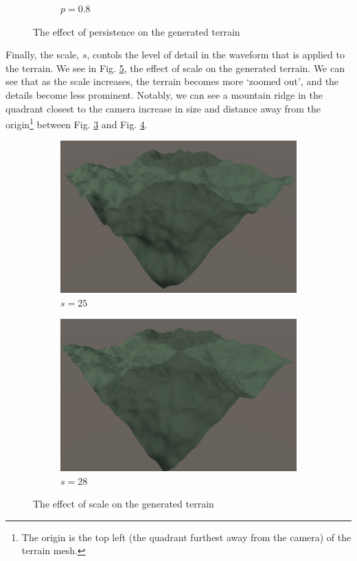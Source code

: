\documentclass{article}
\begin{document}
\begin{figure}[H]
\begin{subfigure}{0.3\textwidth}
        \caption{$p=0.8$}
        \label{fig:persistence0.8}
    \end{subfigure}
    \caption{The effect of persistence on the generated terrain}
    \label{fig:persistence}
\end{figure}

Finally, the scale, $s$, contols the level of detail in the waveform that is applied to the terrain. We see in Fig. \ref{fig:scale}, the effect of scale on the generated terrain. We can see that as the scale increases, the terrain becomes more `zoomed out', and the details become less prominent. Notably, we can see a mountain ridge in the quadrant closest to the camera increase in size and distance away from the origin\footnote{The origin is the top left (the quadrant furthest away from the camera) of the terrain mesh.} between Fig. \ref{fig:scale25} and Fig. \ref{fig:scale28}.

\begin{figure}[H]
    \centering
    \begin{subfigure}{0.45\textwidth}
        \centering
        \includegraphics[width=\linewidth]{scale25.png}
        \caption{$s=25$}
        \label{fig:scale25}
    \end{subfigure}
    \hfill
    \begin{subfigure}{0.45\textwidth}
        \centering
        \includegraphics[width=\linewidth]{scale28.png}
        \caption{$s=28$}
        \label{fig:scale28}
    \end{subfigure}
    \caption{The effect of scale on the generated terrain}
    \label{fig:scale}
\end{figure}
\end{document}
